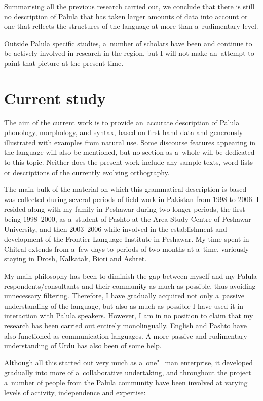 Summarising all the previous research carried out, we conclude that there is still no description of
Palula that has taken larger amounts of data into account or one that reflects the structures of the
language at more than a~rudimentary level.


Outside Palula specific studies, a~number of scholars have been and continue to be actively involved
in research in the region, but I will not make an~attempt to paint that picture at the present time.


\section{Current study}
\label{sec:1-6}

The aim of the current work is to provide an~accurate description of Palula phonology, morphology,
and syntax, based on first hand data and generously illustrated with examples from natural use. Some
discourse features appearing in the language will also be mentioned, but no section as a~whole will
be dedicated to this topic. Neither does the present work include any sample texts, word lists or
descriptions of the currently evolving orthography.


The main bulk of the material on which this grammatical description is based was collected during
several periods of field work in Pakistan from 1998 to 2006. I resided along with my family in
Peshawar during two longer periods, the first being 1998--2000, as a~student of Pashto at the Area
Study Centre of Peshawar University, and then 2003--2006 while involved in the establishment and
development of the Frontier Language Institute in Peshawar. My time spent in Chitral extends from
a~few days to periods of two months at a~time, variously staying in Drosh, Kalkatak, Biori and
Ashret.


My main philosophy has been to diminish the gap between myself and my Palula respondents/consultants
and their community as much as possible, thus avoiding unnecessary filtering. Therefore, I have
gradually acquired not only a~passive understanding of the language, but also as much as possible I
have used it in interaction with Palula speakers. However, I am in no position to claim that my
research has been carried out entirely monolingually. English and Pashto have also functioned as
communication languages. A more passive and rudimentary understanding of Urdu has also been of some
help.


Although all this started out very much as a~one"=man enterprise, it developed gradually into more of
a~collaborative undertaking, and throughout the project a~number of people from the Palula community
have been involved at varying levels of activity, independence and expertise:


